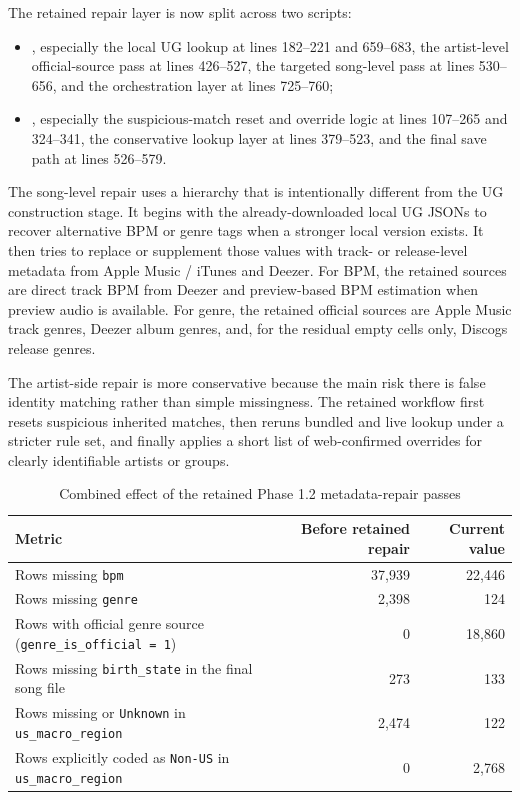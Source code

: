 \documentclass[11pt]{article}
\begin{document}
The retained repair layer is now split across two scripts:
\begin{itemize}[leftmargin=2em]
\item {},
especially the local UG lookup at lines 182--221 and 659--683, the artist-level
official-source pass at lines 426--527, the targeted song-level pass at lines
530--656, and the orchestration layer at lines 725--760;
\item {},
especially the suspicious-match reset and override logic at lines 107--265 and
324--341, the conservative lookup layer at lines 379--523, and the final save
path at lines 526--579.
\end{itemize}

The song-level repair uses a hierarchy that is intentionally different from the
UG construction stage. It begins with the already-downloaded local UG JSONs to
recover alternative BPM or genre tags when a stronger local version exists. It
then tries to replace or supplement those values with track- or release-level
metadata from Apple Music / iTunes and Deezer. For BPM, the retained sources are
direct track BPM from Deezer and preview-based BPM estimation when preview audio
is available. For genre, the retained official sources are Apple Music track
genres, Deezer album genres, and, for the residual empty cells only, Discogs
release genres.

The artist-side repair is more conservative because the main risk there is false
identity matching rather than simple missingness. The retained workflow first
resets suspicious inherited matches, then reruns bundled and live lookup under a
stricter rule set, and finally applies a short list of web-confirmed overrides
for clearly identifiable artists or groups.

\begin{table}[H]
\centering
\caption{Combined effect of the retained Phase 1.2 metadata-repair passes}
\begin{tabularx}{\textwidth}{Y r r}
\toprule
Metric & Before retained repair & Current value \\
\midrule
Rows missing \texttt{bpm} & 37,939 & 22,446 \\
Rows missing \texttt{genre} & 2,398 & 124 \\
Rows with official genre source (\texttt{genre\_is\_official = 1}) & 0 & 18,860 \\
Rows missing \texttt{birth\_state} in the final song file & 273 & 133 \\
Rows missing or \texttt{Unknown} in \texttt{us\_macro\_region} & 2,474 & 122 \\
Rows explicitly coded as \texttt{Non-US} in \texttt{us\_macro\_region} & 0 & 2,768 \\
\bottomrule
\end{tabularx}
\end{table}
\end{document}
